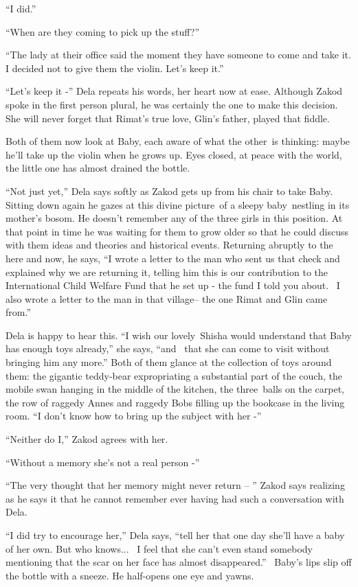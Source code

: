 \documentclass[twoside,11pt]{book}
\begin{document}
``I did.''

``When are they coming to pick up the stuff?''

``The lady at their office said the moment they have someone to come and take it. I decided not to give
them the violin. Let's keep it.''

``Let's keep it -'' Dela repeats his words, her heart now at ease. Although Zakod spoke in the
first person plural, he was certainly the one to make this decision. She will never forget that Rimat's true love,
Glin's father, played that fiddle.

Both of them now look at Baby, each aware of what the other~is thinking: maybe he'll take up the violin when he grows
up. Eyes closed, at peace with the world, the little one has almost drained the bottle.

``Not just yet,'' Dela says softly as Zakod gets up from his chair to take Baby. Sitting down
again he gazes at this divine picture~of a sleepy baby~nestling in its mother's bosom. He doesn't remember any of the
three girls in this position. At that point in time he was waiting for them to grow older so that he could discuss with
them ideas and theories and historical events. Returning abruptly to the here and now, he says, ``I wrote
a letter to the man who sent us that check and explained why we are returning it, telling him this is our contribution
to the International Child Welfare Fund that he set up - the fund I told you about. ~I also wrote a letter to the man
in that village-- the one Rimat and Glin came from.''

Dela is happy to hear this. ``I wish our lovely~Shisha would understand that Baby has enough toys
already,'' she says, ``and \ that she can come to visit without bringing him any more.'' Both of them
glance at the collection of toys around them: the gigantic teddy-bear expropriating a substantial part of the couch,
the mobile swan hanging in the middle of the kitchen, the three~balls on the carpet, the row of raggedy Annes and
raggedy Bobs filling up the bookcase in the living room. ``I don't know how to bring up the subject with
her -''

``Neither do I,'' Zakod agrees with her.

``Without a memory she's not a real person -''

``The very thought that her memory might never return -- '' Zakod says realizing as he says it
that he cannot remember ever having had such a conversation with Dela.

``I did try to encourage her,'' Dela says, ``tell her that one day she'll have a
baby of her own. But who knows...~ I feel that she can't even stand somebody mentioning that the scar on her face has
almost disappeared.'' \ Baby's lips slip off the bottle with a sneeze. He half-opens one eye and yawns.
\end{document}
